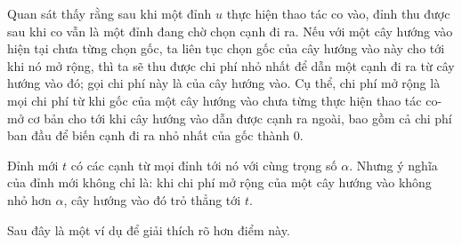 \documentclass[11pt]{article}
\begin{document}
Quan sát thấy rằng sau khi một đỉnh \(u\) thực hiện thao tác co vào, đỉnh thu
được sau khi co vẫn là một đỉnh đang chờ chọn cạnh đi ra. Nếu với một cây hướng
vào hiện tại chưa từng chọn gốc, ta liên tục chọn gốc của cây hướng vào này cho
tới khi nó mở rộng, thì ta sẽ thu được chi phí nhỏ nhất để dẫn một cạnh đi ra
từ cây hướng vào đó; gọi chi phí này là  của cây hướng
vào. Cụ thể, chi phí mở rộng là mọi chi phí từ khi gốc của một cây hướng vào
chưa từng thực hiện thao tác co-mở cơ bản cho tới khi cây hướng vào dẫn được
cạnh ra ngoài, bao gồm cả chi phí ban đầu để biến cạnh đi ra nhỏ nhất của gốc
thành \(0\).

Đỉnh mới \(t\) có các cạnh từ mọi đỉnh tới nó với cùng trọng số \(\alpha\).
Nhưng ý nghĩa của đỉnh mới không chỉ là: khi chi phí mở rộng của một cây hướng
vào không nhỏ hơn \(\alpha\), cây hướng vào đó trỏ thẳng tới \(t\).

Sau đây là một ví dụ để giải thích rõ hơn điểm này.
\end{document}
